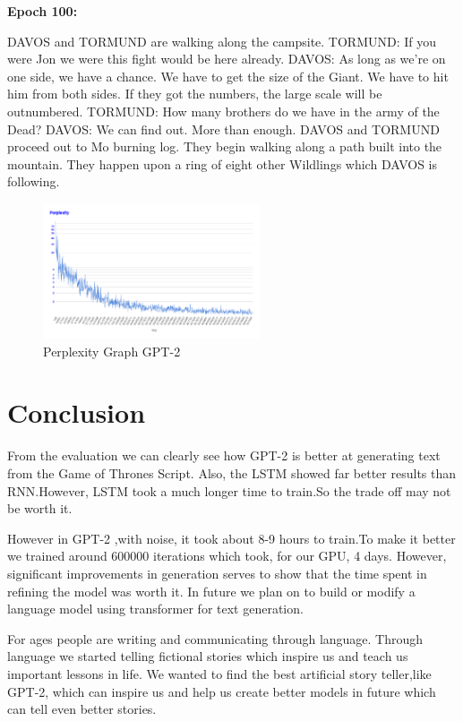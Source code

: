 \documentclass[11pt,a4paper]{article}
\begin{document}
\textbf{Epoch 100:}\newline 

DAVOS and TORMUND are walking along the campsite.\newline 
TORMUND: If you were Jon we were this fight would be here already.\newline 
DAVOS: As long as we’re on one side, we have a chance. We have to get the size of the Giant. We have to hit him from both sides. If they got the numbers, the large scale will be outnumbered.\newline 
TORMUND: How many brothers do we have in the army of the Dead?\newline 
DAVOS: We can find out. More than enough.\newline 
DAVOS and TORMUND proceed out to Mo burning log. They begin walking along a path built into the mountain. They happen upon a ring of eight other Wildlings which DAVOS is following.\newline 


\begin{figure}[h]
\includegraphics[width=1.1\linewidth,height=4cm]{GPTPerp.png}
\caption{Perplexity Graph GPT-2}
\end{figure}


\section{Conclusion}
From the evaluation we can clearly see how GPT-2 is better at generating text from the Game of Thrones Script. Also, the LSTM showed far better results than RNN.However, LSTM took a much longer time to train.So the trade off may not be worth it. 

However in GPT-2 ,with noise, it took about 8-9 hours to train.To make it better we trained around 600000 iterations which took, for our GPU, 4 days. However, significant improvements in generation serves to show that the time spent in refining the model was worth it. In future we plan on to build or modify a language model using transformer for text generation.

For ages people are writing and communicating through language. Through language we  started telling fictional stories which inspire us and teach us important lessons in life. We  wanted to find the best artificial story teller,like GPT-2, which can inspire us and help us create better models in future which can tell even better stories.  




\appendix
\end{document}

